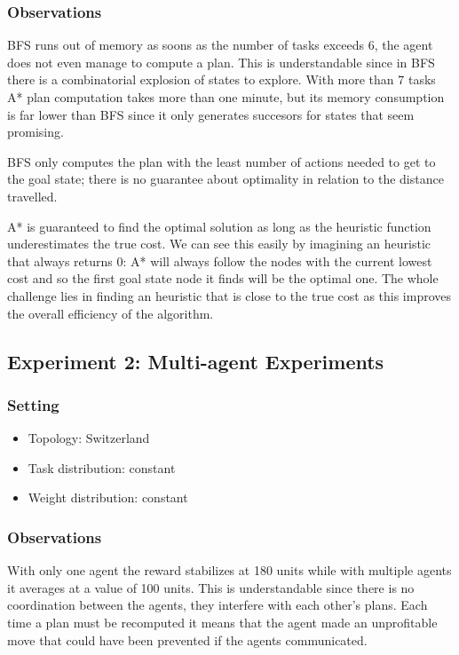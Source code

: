 \documentclass[11pt]{article}
\begin{document}
\subsubsection{Observations}
BFS runs out of memory as soons as the number of tasks exceeds 6, the agent does
not even manage to compute a plan. This is understandable since in BFS there is
a combinatorial explosion of states to explore. With more than 7 tasks A* plan
computation takes more than one minute, but its memory consumption is far lower
than BFS since it only generates succesors for states that seem promising.

BFS only computes the plan with the least number of actions needed to get to the
goal state; there is no guarantee about optimality in relation to the distance
travelled.

A* is guaranteed to find the optimal solution as long as the heuristic function
underestimates the true cost. We can see this easily by imagining an heuristic
that always returns 0: A* will always follow the nodes with the current lowest
cost and so the first goal state node it finds will be the optimal one. The
whole challenge lies in finding an heuristic that is close to the true cost as
this improves the overall efficiency of the algorithm.

\subsection{Experiment 2: Multi-agent Experiments}

\subsubsection{Setting}
\begin{itemize}
\item Topology: Switzerland
\item Task distribution: constant
\item Weight distribution: constant
\end{itemize}

\subsubsection{Observations}
With only one agent the reward stabilizes at 180 units while with multiple
agents it averages at a value of 100 units. This is understandable since there
is no coordination between the agents, they interfere with each other's plans.
Each time a plan must be recomputed it means that the agent made an unprofitable
move that could have been prevented if the agents communicated.
\end{document}
